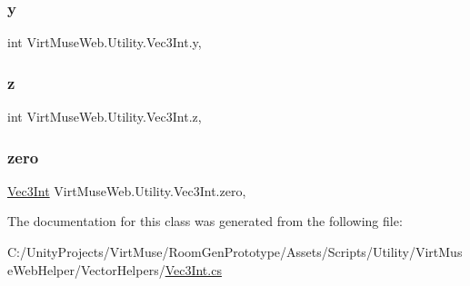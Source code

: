 \subsubsection{\texorpdfstring{y}{y}}
{\footnotesize\ttfamily int Virt\+Muse\+Web.\+Utility.\+Vec3\+Int.\+y\hspace{0.3cm}{\ttfamily [get]}, {\ttfamily [set]}}

\mbox{\label{class_virt_muse_web_1_1_utility_1_1_vec3_int_a4e6192905bc3fc945ac608f334ef0475}} 
\subsubsection{\texorpdfstring{z}{z}}
{\footnotesize\ttfamily int Virt\+Muse\+Web.\+Utility.\+Vec3\+Int.\+z\hspace{0.3cm}{\ttfamily [get]}, {\ttfamily [set]}}

\mbox{\label{class_virt_muse_web_1_1_utility_1_1_vec3_int_adc6d755fdfb4336b9378aa5e6416924f}} 
\subsubsection{\texorpdfstring{zero}{zero}}
{\footnotesize\ttfamily \mbox{\hyperlink{class_virt_muse_web_1_1_utility_1_1_vec3_int}{Vec3\+Int}} Virt\+Muse\+Web.\+Utility.\+Vec3\+Int.\+zero\hspace{0.3cm}{\ttfamily [static]}, {\ttfamily [get]}}



The documentation for this class was generated from the following file\+:\begin{DoxyCompactItemize}
\item 
C\+:/\+Unity\+Projects/\+Virt\+Muse/\+Room\+Gen\+Prototype/\+Assets/\+Scripts/\+Utility/\+Virt\+Muse\+Web\+Helper/\+Vector\+Helpers/\mbox{\hyperlink{_vec3_int_8cs}{Vec3\+Int.\+cs}}\end{DoxyCompactItemize}

